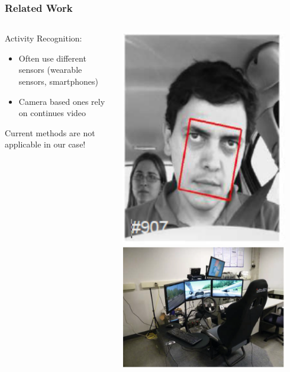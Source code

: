 \documentclass{beamer}
\begin{document}
	\begin{frame}
		\frametitle{Related Work}
		
		\begin{columns}
			\begin{column}{0.75\textwidth}
				Activity Recognition:
				\begin{itemize}
					\item Often use different sensors (wearable sensors, smartphones)
					\item Camera based ones rely on continues video

				\end{itemize}		
				Current methods are not applicable in our case!
			\end{column}
			\begin{column}{0.25\textwidth}  %
				\begin{center}
					\includegraphics[width=0.9\textwidth]{frontal-view-dataset} \\
					\includegraphics[width=0.9\textwidth]{RanForSim}

\end{center}
\end{column}
\end{columns}
\end{frame}
\end{document}
